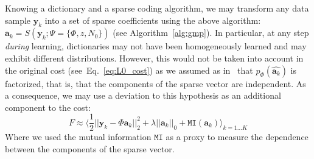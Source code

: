 \documentclass[draft]{article} %
\newcommand{\coef}{\mathbf{a}} %
\newcommand{\image}{\mathbf{y}} %
\newcommand{\dico}{\Phi} %
\newcommand{\norm}[1]{|\!| #1 |\!|}
\newcommand{\seeEq}[1]{Eq.~\ref{eq:#1}}%
\begin{document}
\begin{figure}
{%
\label{fig:HEH}}%
\end{figure}%
Knowing a dictionary and a sparse coding algorithm, we may transform any data sample $\image_k$ into a set of sparse coefficients using the above algorithm: $\coef_{k} = S(\image_k; \Psi=\{\dico, z, N_0\})$ (see Algorithm~\ref{alg:gmp}). In particular, at any step \emph{during} learning, dictionaries may not have been homogeneously learned and may exhibit different distributions. %
However, this would not be taken into account in the original cost (see~\seeEq{L0_cost}) as we assumed as in~\citet{Olshausen97} that $p_\dico(\hat{\coef_{k}})$ is factorized, that is, that the components of the sparse vector are independent. As a consequence, we may use a deviation to this hypothesis as an additional component to the cost: 
\begin{equation}%
F \approx  \langle \frac{1}{2} \norm{\image_k - \dico \coef_{k}}_2^2 + \lambda\norm{\coef_{k}}_0 + \texttt{MI}(\coef_{k}) \rangle_{k = 1 \ldots K}%
\label{eq:L0_cost_full}%
\end{equation}%
Where we used the mutual information $\texttt{MI}$ as a proxy to measure the dependence between the components of the sparse vector. %
\end{document}
